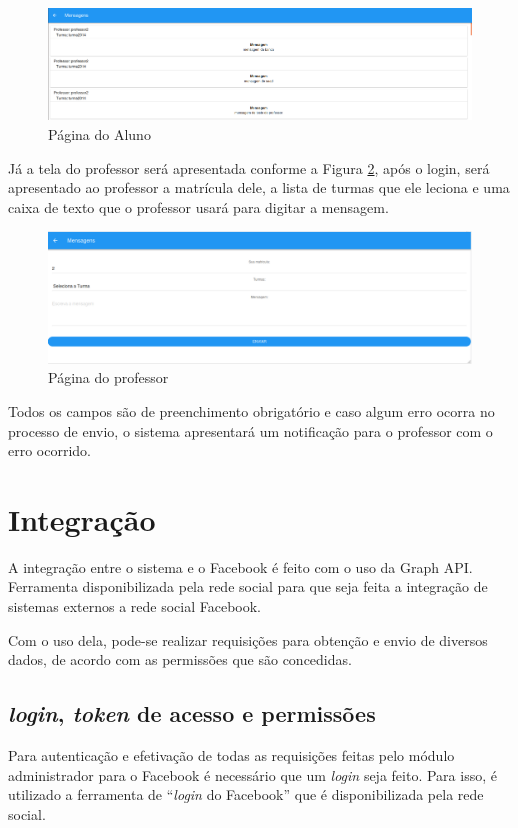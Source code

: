 \begin{figure}
\centering
\includegraphics[width=\textwidth]{figuras/mobile3}
\caption{Página do Aluno}
\label{fig:mobile2}
\end{figure}

Já a tela do professor será apresentada conforme a Figura \ref{fig:mobile3}, após o login, será apresentado ao professor a matrícula dele, a lista de turmas que ele leciona e uma caixa de texto que o professor usará para digitar a mensagem.

\begin{figure}[H]
\centering
\includegraphics[width=\textwidth]{figuras/mobile2}
\caption{Página do professor}
\label{fig:mobile3}
\end{figure}

Todos os campos são de preenchimento obrigatório e caso algum erro ocorra no processo de envio, o sistema apresentará um notificação para o professor com o erro ocorrido.

\section{Integração}
A integração entre o sistema e o Facebook é feito com o uso da Graph API. Ferramenta disponibilizada pela rede social para que seja feita a integração de sistemas externos a rede social Facebook.

Com o uso dela, pode-se realizar requisições para obtenção e envio de diversos dados, de acordo com as permissões que são concedidas.

\subsection{\textit{login}, \textit{token} de acesso e permissões}
Para autenticação e efetivação de todas as requisições feitas pelo módulo administrador para o Facebook é necessário que um \textit{login} seja feito. Para isso, é utilizado a ferramenta de ``\textit{login} do Facebook''  que é disponibilizada pela rede social.

